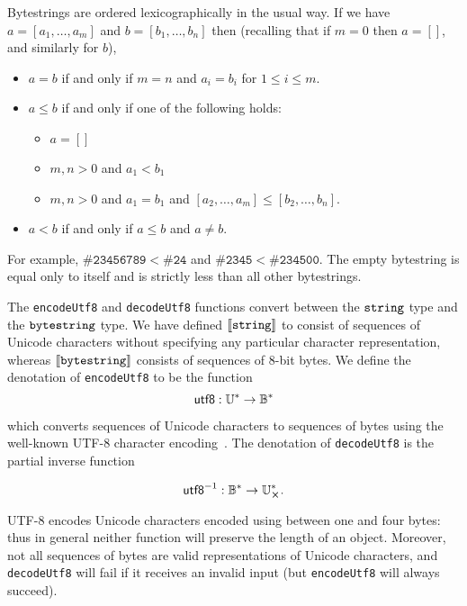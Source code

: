 \label{note:bytestring-comparison}
Bytestrings are ordered lexicographically in the usual way. If we have $a =
  [a_1, \ldots, a_m]$ and $b = [b_1, \ldots, b_n]$ then (recalling that if $m=0$
  then $a=[]$, and similarly for $b$),
\begin{itemize}
\item $a = b$ if and only if $m=n$ and $a_i = b_i$ for $1 \leq i \leq m$.

\item $a \leq b$ if and only if one of the following holds:
\begin{itemize}
  \item $a = []$
  \item $m,n > 0$ and $a_1 < b_1$
  \item $m,n > 0$ and $a_1 = b_1$ and $[a_2,\ldots,a_m] \leq [b_2,\ldots,b_n]$.
\end{itemize}
\item $a < b$ if and only if $a \leq b$ and $a \neq b$.
\end{itemize}
\noindent For example, $\mathtt{\#23456789} < \mathtt{\#24}$ and
$\mathtt{\#2345} < \mathtt{\#234500}$.  The empty bytestring is equal only to
itself and is strictly less than all other bytestrings.

\label{note:bytestring-encoding}
The \texttt{encodeUtf8} and \texttt{decodeUtf8} functions convert between the
$\mathtt{string}$ type and the $\mathtt{bytestring}$ type.  We have defined
$\llbracket\mathit{\mathtt{string}}\rrbracket$ to consist of sequences of Unicode characters without
specifying any particular character representation, whereas
$\llbracket\mathit{\mathtt{bytestring}}\rrbracket$ consists of sequences of 8-bit bytes.  We define the
denotation of \texttt{encodeUtf8} to be the function
$$
\mathsf{utf8}: \mathbb{U}^* \rightarrow \mathbb{B}^*
$$

\noindent which converts sequences of Unicode characters to sequences of bytes using the
well-known UTF-8 character encoding~\cite[Definition  D92]{Unicode-standard}.
The denotation of \texttt{decodeUtf8} is the partial inverse function

$$
\unutfeight: \B^* \rightarrow \U^*_{\errorX}.
$$

\noindent UTF-8 encodes Unicode characters encoded using between one and four
bytes: thus in general neither function will preserve the length of an object.
Moreover, not all sequences of bytes are valid representations of Unicode
characters, and \texttt{decodeUtf8} will fail if it receives an invalid input
(but \texttt{encodeUtf8} will always succeed).


